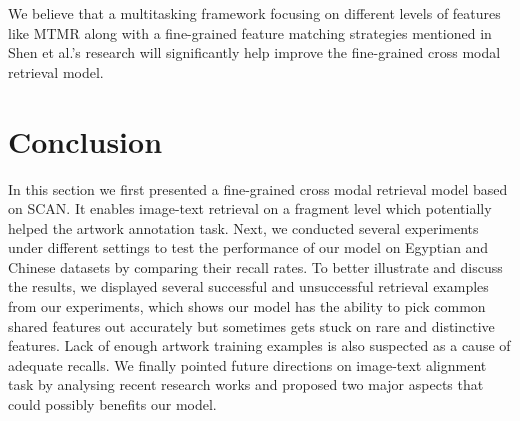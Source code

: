 We believe that a multitasking framework focusing on different levels of features like MTMR \cite{parttowhole} along with a fine-grained feature matching strategies mentioned in Shen et al.'s research \cite{shen2019discovering} will significantly help improve the fine-grained cross modal retrieval model.

\section{Conclusion}
In this section we first presented a fine-grained cross modal retrieval model based on SCAN. It enables image-text retrieval on a fragment level which potentially helped the artwork annotation task. Next, we conducted several experiments under different settings to test the performance of our model on Egyptian and Chinese datasets by comparing their recall rates. To better illustrate and discuss the results, we displayed several successful and unsuccessful retrieval examples from our experiments, which shows our model has the ability to pick common shared features out accurately but sometimes gets stuck on rare and distinctive features. Lack of enough artwork training examples is also suspected as a cause of adequate recalls. We finally pointed future directions on image-text alignment task by analysing recent research works and proposed two major aspects that could possibly benefits our model.

